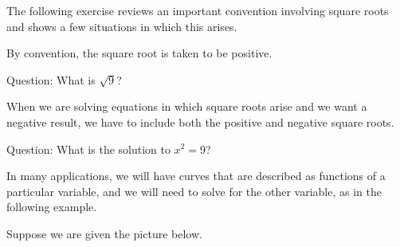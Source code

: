 \documentclass{ximera}
\author{Jim Talamo}
\begin{document}
\begin{exercise}

The following exercise reviews an important convention involving square roots and shows a few situations in which this arises.
 
\begin{fact}
By convention, the square root is taken to be positive.
\end{fact}
 
Question: What is $\sqrt{9}$?
 \begin{multipleChoice}
 \end{multipleChoice}
 
 
 \begin{exercise}
When we are solving equations in which square roots arise and we want a negative result, we have to include both the positive and negative square roots.
 
Question: What is the solution to $x^2=9$?
  \begin{multipleChoice}
 \end{multipleChoice}
 
\begin{exercise}
In many applications, we will have curves that are described as functions of a particular variable, and we will need to solve for the other variable, as in the following example.

Suppose we are given the picture below.


 \begin{image}
\end{image}
\end{exercise}
\end{exercise}
\end{exercise}
\end{document}
